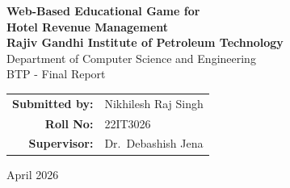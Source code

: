 \documentclass[12pt,a4paper,openany]{report}
\begin{document}
\begin{titlepage}
\centering

\vspace*{1cm}

{\LARGE\bfseries Web-Based Educational Game for\\[0.3cm]Hotel Revenue Management}\\[1.5cm]

{\large\bfseries Rajiv Gandhi Institute of Petroleum Technology}\\[0.3cm]
{\large Department of Computer Science and Engineering}\\[2.5cm]



{\large BTP - Final Report}\\[3cm]

\begin{tabular}{rl}
\textbf{Submitted by:} & Nikhilesh Raj Singh \\
\textbf{Roll No:}       & 22IT3026 \\[0.8cm]
\textbf{Supervisor:}    & Dr.\ Debashish Jena \\
\end{tabular}

\vfill

{\large April 2026}

\end{titlepage}

\newpage
\setcounter{page}{1}
\end{document}
